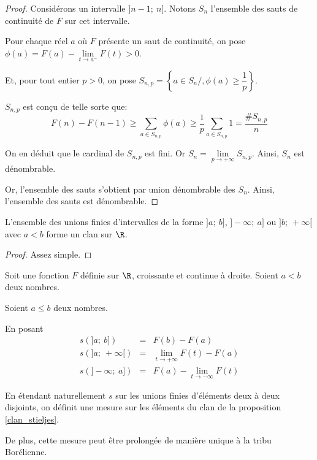 \begin{proof}
Considérons un intervalle $]n-1;~n]$. Notons $S_n$ l'ensemble des sauts de continuité de $F$ sur cet intervalle.

Pour chaque réel $a$ où $F$ présente un saut de continuité, on pose $\phi(a) = F(a)-\lim \limits_{t \to a^{-}} F(t) > 0$.

Et, pour tout entier $p>0$, on pose $S_{n,p} = \left \{a \in S_n/ , \phi(a) \geq \dfrac{1}{p} \right \}$.

$S_{n,p}$ est conçu de telle sorte que:
\[
F(n)-F(n-1) \geq \displaystyle{\sum \limits_{a \in S_{n,p}}} \phi(a) \geq \dfrac{1}{p} \displaystyle{\sum \limits_{a \in S_{n,p}}} 1 = \dfrac{\#{S_{n,p}}}{n}
\]

On en déduit que le cardinal de $S_{n,p}$ est fini. Or $S_n = \lim \limits_{p \to +\infty} S_{n,p}$. Ainsi, $S_n$ est dénombrable.

Or, l'ensemble des sauts s'obtient par union dénombrable des $S_n$. Ainsi, l'ensemble des sauts est dénombrable.
\end{proof}

\begin{prop}
\label{clan_stieljes}
L'ensemble des unions finies d'intervalles de la forme $]a;~b]$, $]-\infty;~a]$ ou $]b;~+\infty[$ avec $a < b$ forme un clan sur $\R$.
\end{prop}

\begin{proof}
Assez simple.
\end{proof}

\begin{theo}[Stieljes]
Soit une fonction $F$ définie sur $\R$, croissante et continue à droite. Soient $a <  b$ deux nombres.

Soient $a \leq b$ deux nombres.

En posant 
\[
\begin{array}{lcl}
s\left(]a;~b]\right)  & = & F(b)-F(a) \\
s\left(]a;~+\infty[\right)  & = & \lim \limits_{t \to +\infty} F(t)-F(a)  \\
s\left(]-\infty;~a]\right)  & = & F(a)- \lim \limits_{t \to -\infty} F(t)
\end{array}
\]

En étendant naturellement $s$ sur les unions finies d'éléments deux à deux disjoints, on définit une mesure sur les éléments du clan de la proposition \ref{clan_stieljes}.

De plus, cette mesure peut être prolongée de manière unique à la tribu Borélienne.
\end{theo}

